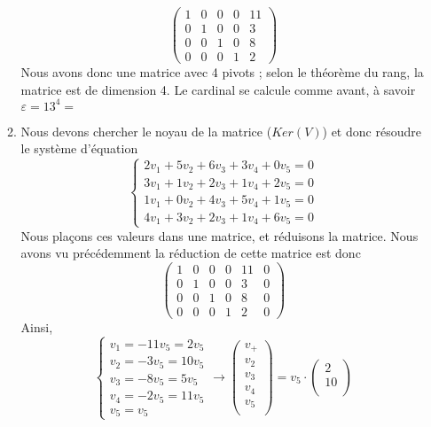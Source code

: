 \documentclass[10p,a4paper]{scrartcl}
\renewcommand{\(}{\left(}
\renewcommand{\)}{\right)}
\begin{document}
\begin{enumerate}
\begin{enumerate}
						\[\begin{pmatrix}
							1 & 0 & 0 & 0 & 11\\
							0 & 1 & 0 & 0 & 3\\
							0 & 0 & 1 & 0 & 8\\
							0 & 0 & 0 & 1 & 2
						\end{pmatrix}\]
						 Nous avons donc une matrice avec 4 pivots ; selon le théorème du rang, la matrice est de dimension 4. Le cardinal se calcule comme avant, à savoir $\varepsilon = 13^4 =$ 
				\item	Nous devons chercher le noyau de la matrice ($Ker(V)$) et donc résoudre le système d'équation
				\[\left\{\begin{array}{l}
					2v_1 + 5v_2 + 6v_3 + 3v_4 + 0v_5 = 0\\
					3v_1 + 1v_2 + 2v_3 + 1v_4 + 2v_5 = 0\\
					1v_1 + 0v_2 + 4v_3 + 5v_4 + 1v_5 = 0\\
					4v_1 + 3v_2 + 2v_3 + 1v_4 + 6v_5 = 0
				\end{array}\right.\]
				Nous plaçons ces valeurs dans une matrice, et réduisons la matrice. Nous avons vu précédemment la réduction de cette matrice est donc
				\[\left(\begin{array}{ccccc|c}
							1 & 0 & 0 & 0 & 11 & 0\\
							0 & 1 & 0 & 0 & 3 & 0\\
							0 & 0 & 1 & 0 & 8 & 0\\
							0 & 0 & 0 & 1 & 2 & 0
				\end{array}\right)\]
				Ainsi,
				\[\left\{\begin{array}{l}
					v_1 = -11v_5 = 2v_5\\
					v_2 = -3v_5 = 10v_5\\
					v_3 = -8v_5 = 5v_5\\
					v_4 = -2v_5 = 11v_5\\
					v_5 = v_5
				\end{array}\right. \to 
				\begin{pmatrix}
				v_+\\
				v_2\\
				v_3\\
				v_4\\
				v_5\\
				\end{pmatrix}
				= v_5\cdot
				\begin{pmatrix}
				2\\
				10\\

\end{pmatrix}\]
\end{enumerate}
\end{enumerate}
\end{document}
